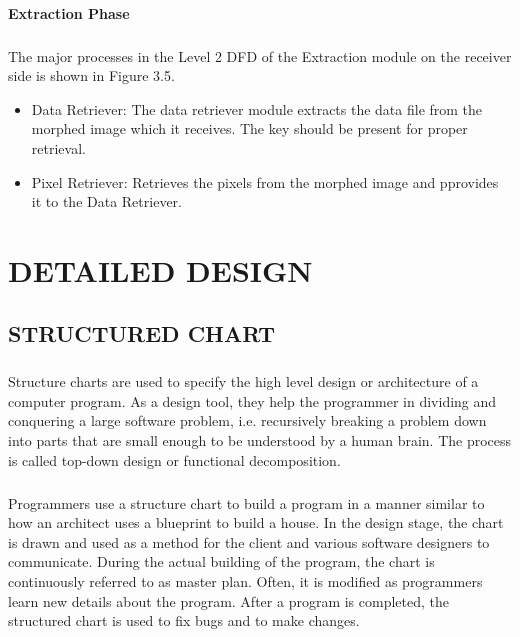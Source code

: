\documentclass[12pt]{report}
\begin{document}
\subsubsection{Extraction Phase}
\paragraph{}The major processes in the Level 2 DFD of the Extraction module on the receiver side is shown in Figure 3.5. 
\begin{itemize}
\item Data Retriever: The data retriever module extracts the data file from the morphed image which it receives. The key should be present for proper retrieval.
\item Pixel Retriever: Retrieves the pixels from the morphed image and pprovides it to the Data Retriever.
\end{itemize}
\pagebreak

\chapter{DETAILED DESIGN}
\pagestyle{fancy}
\chead{}
\rfoot{\small{\thepage}}
\renewcommand{\headrulewidth}{0.4pt}
\renewcommand{\footrulewidth}{0.4pt}
\section{STRUCTURED CHART}
\paragraph{}Structure charts are used to specify the high level design or architecture of a computer program. As a design tool, they help the programmer in dividing and conquering a large software problem, i.e. recursively breaking a problem down into parts that are small enough to be understood by a human brain. The process is called top-down design or functional decomposition. 
\paragraph{}Programmers use a structure chart to build a program in a manner similar to how an architect uses a blueprint to build a house. In the design stage, the chart is drawn and used as a method for the client and various software designers to communicate. During the actual building of the program, the chart is continuously referred to as master plan. Often, it is modified as programmers learn new details about the program. After a program is completed, the structured chart is used to fix bugs and to make changes.
\end{document}
